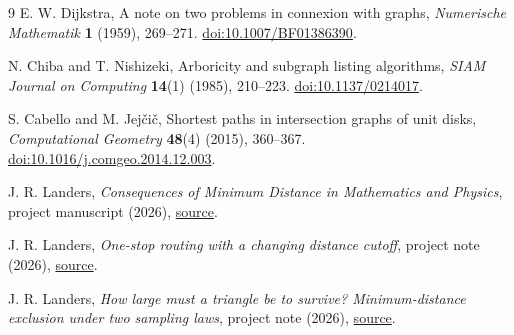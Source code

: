 \documentclass[11pt]{article}
\begin{document}
\begin{thebibliography}{9}
\small
\setlength{\itemsep}{2pt}
E. W. Dijkstra, A note on two problems in connexion with graphs,
\emph{Numerische Mathematik} \textbf{1} (1959), 269--271.
\href{https://doi.org/10.1007/BF01386390}{doi:10.1007/BF01386390}.

N. Chiba and T. Nishizeki, Arboricity and subgraph listing algorithms,
\emph{SIAM Journal on Computing} \textbf{14}(1) (1985), 210--223.
\href{https://doi.org/10.1137/0214017}{doi:10.1137/0214017}.

S. Cabello and M. Jej\v{c}i\v{c}, Shortest paths in intersection graphs
of unit disks, \emph{Computational Geometry} \textbf{48}(4) (2015),
360--367.
\href{https://doi.org/10.1016/j.comgeo.2014.12.003}{doi:10.1016/j.comgeo.2014.12.003}.

J. R. Landers, \emph{Consequences of Minimum Distance in Mathematics
and Physics}, project manuscript (2026),
\href{https://github.com/jonland82/minimum-distance-analytical-mechanics/blob/master/consequences_of_minimum_distance.tex}{source}.

J. R. Landers, \emph{One-stop routing with a changing distance cutoff},
project note (2026),
\href{https://github.com/jonland82/minimum-distance-analytical-mechanics/blob/master/routing_note/one_stop_routing.tex}{source}.

J. R. Landers, \emph{How large must a triangle be to survive? Minimum-distance
exclusion under two sampling laws}, project note (2026),
\href{https://github.com/jonland82/minimum-distance-analytical-mechanics/blob/master/triangle_companion/triangle_exclusion.tex}{source}.
\end{thebibliography}
\end{document}

